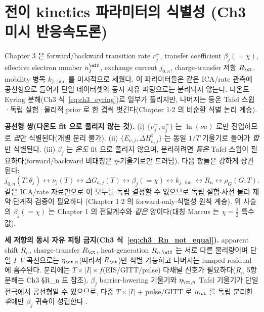 \section{전이 kinetics 파라미터의 식별성 (Ch3 미시 반응속도론)}\label{sec:ch6_ch3_ident}
Chapter 3 은 forward/backward transition rate $r_j^\pm$, transfer coefficient $\beta_j(=\chi)$, effective
electron number $n_j^{\eff}$, exchange current $j_{0,n}$, charge-transfer 저항 $R_\ct$, mobility 병목
$k_{j,\lim}$ 를 미시적으로 세웠다. 이 파라미터들은 같은 ICA/rate 관측에 공선형으로 들어가 단일 데이터셋의
동시 자유 피팅으로는 분리되지 않는다. 다온도 Eyring 분해(Ch3 식~\eqref{eq:ch3_eyring})로 일부가 풀리지만,
나머지는 등온 Tafel 스윕·독립 실험·물리적 prior 로 한 겹씩 벗긴다(Chapter 1$\cdot$2 의 비순환 식별 논리 계승).

\textbf{공선형 쌍(다온도 fit 으로 풀리지 않는 것).} (i) $\{\nu_j^\pm,a_j^\pm\}$ 는 $\ln(\nu a)$ 로만 진입하므로
\emph{곱}만 식별된다(개별 분리 불가). (ii) $\{E_{\nu,j},\Delta H_{a,j}^\ddagger\}$ 는 동일 $1/T$ 기울기로 들어가
\emph{합}만 식별된다. (iii) $\beta_j$ 는 \emph{온도} fit 으로 풀리지 않으며, 분리하려면 \emph{등온} Tafel
스윕이 필요하다(forward/backward 비대칭은 $\eta$-기울기로만 드러남). 다음 항들은 강하게 상관된다:
\begin{equation}
j_{0,n}(T,\theta_j)\leftrightarrow\nu_j(T)\leftrightarrow\Delta G_{a,j}(T)\leftrightarrow\beta_j(=\chi)
\leftrightarrow k_{j,\lim}\leftrightarrow R_n\leftrightarrow\rho_G(G;T).
\label{eq:ch3_ident_chain}
\end{equation}
같은 ICA/rate 자료만으로 이 모두를 독립 결정할 수 없으므로 독립 실험$\cdot$사전 물리 제약$\cdot$단계적 검증이
필요하다 \cite{weppner1977,dubarry2012}(Chapter 1$\cdot$2 의 forward-only$\cdot$식별성 원칙 계승). 위 사슬의
$\beta_j(=\chi)$ 는 Chapter 1 의 전달계수와 \emph{같은} 양이다(대칭 Marcus 는 $\chi=\tfrac12$ 특수값).

\textbf{세 저항의 동시 자유 피팅 금지(Ch3 식~\eqref{eq:ch3_Rn_not_equal}).} apparent shift $R_n$,
charge-transfer $R_\ct$, heat-generation $R_{n,\eff}$ 는 서로 다른 물리량이며 단일 $I$--$V$ 곡선으로는
$\eta_{\ct,n}$(따라서 $R_\ct$)만 식별 가능하고 나머지는 lumped residual 에 흡수된다. 분리에는
$T\times|I|\times f$(EIS/GITT/pulse) 다채널 신호가 필요하다($R_n$ 5항 분해는 Ch3 §R_n 표 참조). $\beta_j$
barrier-lowering 기울기와 $\eta_{\ct,n}$ Tafel 기울기가 단일 전극에서 공선형일 수 있으므로, 다중 $T\times|I|$ +
pulse/GITT 로 $\eta_\ct$ 를 독립 분리한 \emph{후}에만 $\beta_j$ 귀속이 성립한다 \cite{weppner1977}.
